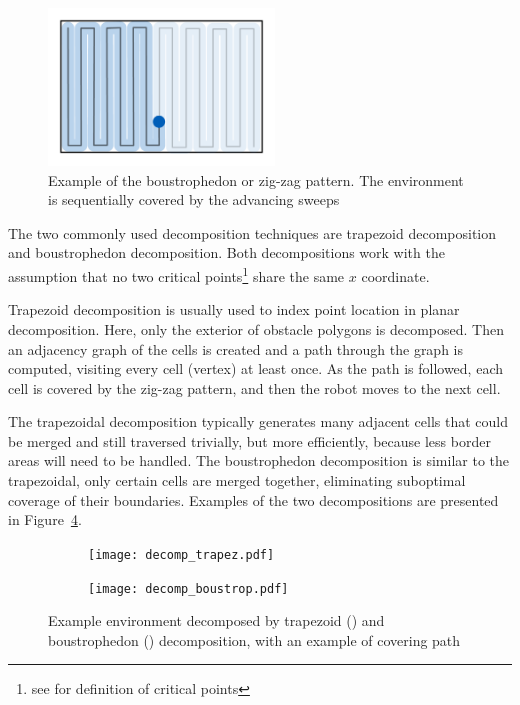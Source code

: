 \documentclass[buriama8_dp.tex]{subfiles}
\begin{document}
\begin{figure}[ht]
  \centering
  \includegraphics[width=6cm]{figures/zigzag.pdf}
  \caption[Boustrophedon pattern]{Example of the boustrophedon or zig-zag pattern. The environment is sequentially covered by the advancing sweeps}
  \label{fig:zig_pattern}
\end{figure}

The two commonly used decomposition techniques are trapezoid decomposition and boustrophedon decomposition. Both decompositions work with the assumption that no two critical points\footnote{see \cite{optimalcoverage} for definition of critical points} share the same \(x\) coordinate.

Trapezoid decomposition is usually used to index point location in planar decomposition.  Here, only the exterior of obstacle polygons is decomposed. Then an adjacency graph of the cells is created and a path through the graph is computed, visiting every cell (vertex) at least once. As the path is followed, each cell is covered by the zig-zag pattern, and then the robot moves to the next cell.

The trapezoidal decomposition typically generates many adjacent cells that could be merged and still traversed trivially, but more efficiently, because less border areas will need to be handled. The boustrophedon decomposition is similar to the trapezoidal, only certain cells are merged together, eliminating suboptimal coverage of their boundaries. Examples of the two decompositions are presented in Figure~\ref{fig:decomps}.

\begin{figure}[ht]
  \begin{subfigure}[t]{0.4\textwidth}
    \texttt{[image: decomp\_trapez.pdf]}
    \caption{}
    \label{fig:decomp_trapez}
  \end{subfigure}
  \begin{subfigure}[t]{0.4\textwidth}
    \texttt{[image: decomp\_boustrop.pdf]}
    \caption{}
    \label{fig:decomp_boustrop}
  \end{subfigure}

  \caption[Trapezoid and boustrophedon decompositions]{Example environment decomposed by trapezoid () and boustrophedon () decomposition, with an example of covering path}
  \label{fig:decomps}
\end{figure}
\end{document}
